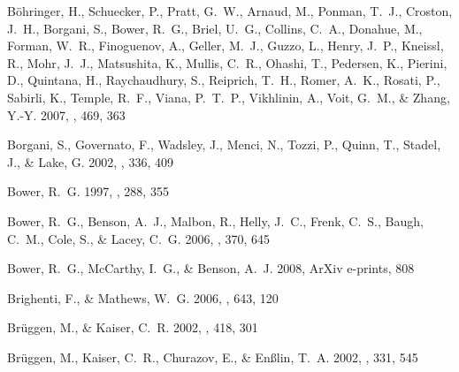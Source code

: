 \documentclass[12pt,preprint]{aastex}
\begin{document}
\begin{thebibliography}{139}
{B{\"o}hringer}, H., {Schuecker}, P., {Pratt}, G.~W., {Arnaud}, M., {Ponman},
  T.~J., {Croston}, J.~H., {Borgani}, S., {Bower}, R.~G., {Briel}, U.~G.,
  {Collins}, C.~A., {Donahue}, M., {Forman}, W.~R., {Finoguenov}, A., {Geller},
  M.~J., {Guzzo}, L., {Henry}, J.~P., {Kneissl}, R., {Mohr}, J.~J.,
  {Matsushita}, K., {Mullis}, C.~R., {Ohashi}, T., {Pedersen}, K., {Pierini},
  D., {Quintana}, H., {Raychaudhury}, S., {Reiprich}, T.~H., {Romer}, A.~K.,
  {Rosati}, P., {Sabirli}, K., {Temple}, R.~F., {Viana}, P.~T.~P., {Vikhlinin},
  A., {Voit}, G.~M., \& {Zhang}, Y.-Y. 2007, \aap, 469, 363

{Borgani}, S., {Governato}, F., {Wadsley}, J., {Menci}, N., {Tozzi}, P.,
  {Quinn}, T., {Stadel}, J., \& {Lake}, G. 2002, \mnras, 336, 409

{Bower}, R.~G. 1997, \mnras, 288, 355

{Bower}, R.~G., {Benson}, A.~J., {Malbon}, R., {Helly}, J.~C., {Frenk}, C.~S.,
  {Baugh}, C.~M., {Cole}, S., \& {Lacey}, C.~G. 2006, \mnras, 370, 645

{Bower}, R.~G., {McCarthy}, I.~G., \& {Benson}, A.~J. 2008, ArXiv e-prints, 808

{Brighenti}, F., \& {Mathews}, W.~G. 2006, \apj, 643, 120

{Br{\"u}ggen}, M., \& {Kaiser}, C.~R. 2002, \nat, 418, 301

{Br{\"u}ggen}, M., {Kaiser}, C.~R., {Churazov}, E., \& {En{\ss}lin}, T.~A.
  2002, \mnras, 331, 545


\end{thebibliography}
\end{document}
